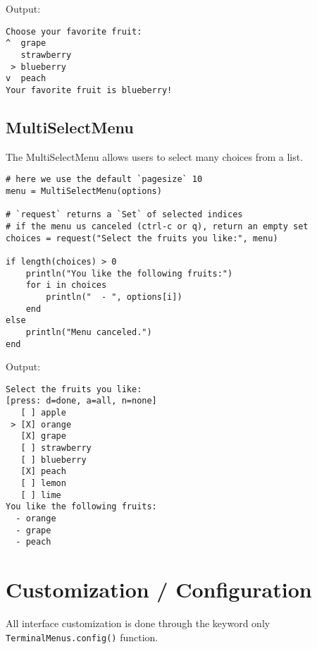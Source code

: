 Output:




\begin{lstlisting}
Choose your favorite fruit:
^  grape
   strawberry
 > blueberry
v  peach
Your favorite fruit is blueberry!
\end{lstlisting}



\hypertarget{6295927836435212296}{}


\subsection{MultiSelectMenu}



The MultiSelectMenu allows users to select many choices from a list.




\begin{verbatim}
# here we use the default `pagesize` 10
menu = MultiSelectMenu(options)

# `request` returns a `Set` of selected indices
# if the menu us canceled (ctrl-c or q), return an empty set
choices = request("Select the fruits you like:", menu)

if length(choices) > 0
    println("You like the following fruits:")
    for i in choices
        println("  - ", options[i])
    end
else
    println("Menu canceled.")
end
\end{verbatim}



Output:




\begin{lstlisting}
Select the fruits you like:
[press: d=done, a=all, n=none]
   [ ] apple
 > [X] orange
   [X] grape
   [ ] strawberry
   [ ] blueberry
   [X] peach
   [ ] lemon
   [ ] lime
You like the following fruits:
  - orange
  - grape
  - peach
\end{lstlisting}



\hypertarget{664736390801158626}{}


\section{Customization / Configuration}



All interface customization is done through the keyword only \texttt{TerminalMenus.config()} function.



